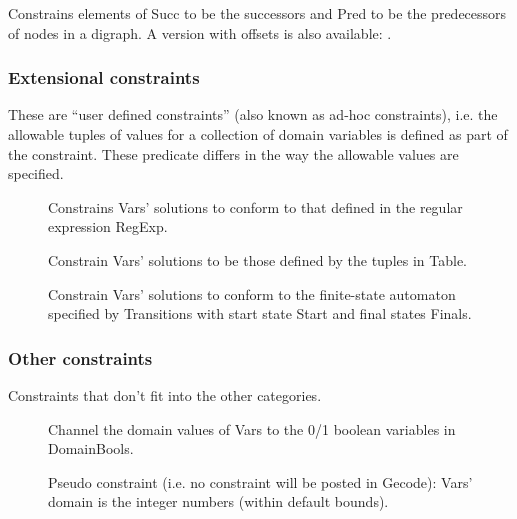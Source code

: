 \begin{description}
\begin{sloppypar}
\item[\biptxtrefni{inverse(+Succ,+Pred)}{inverse/2!gfd}{../bips/lib/gfd/inverse-2.html}]
Constrains elements of Succ to be the successors and
Pred to be the predecessors of nodes in a digraph. A version with offsets
is also available:
.
\end{sloppypar}

\end{description}
 
\subsubsection{Extensional constraints}
These are ``user defined constraints'' (also known as ad-hoc
 constraints), i.e. the allowable tuples of values for a
collection of domain variables is defined as part of the constraint. These
predicate differs in the way the allowable values are specified.

\begin{description}
\item[]
Constrains Vars' solutions to conform to that defined in the regular expression RegExp.

\item[]
Constrain Vars' solutions to be those defined by the tuples in Table.

\item[]
Constrain Vars' solutions to conform to the finite-state 
automaton specified by Transitions with start state Start and  final states Finals.

\end{description}

\subsubsection{Other constraints}

Constraints that don't fit into the other categories.

\begin{description}

\item[]
Channel the domain values of Vars to the 0/1 boolean variables in DomainBools.

\item[]
Pseudo constraint (i.e. no constraint will be posted in Gecode):
Vars' domain is the integer numbers (within default bounds).

\end{description}

